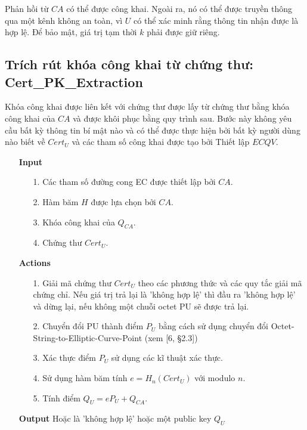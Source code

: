 \documentclass[a4paper,12pt]{report}
\begin{document}
Phản hồi từ $CA$ có thể được công khai. Ngoài ra, nó có thể được truyền thông qua một kênh không an toàn, vì $U$ có thể xác minh rằng thông tin nhận được là hợp lệ. Để bảo mật, giá trị tạm thời $k$ phải được giữ riêng.

\subsection{Trích rút khóa công khai từ chứng thư: Cert\_PK\_Extraction}
Khóa công khai được liên kết với chứng thư được lấy từ chứng thư bằng khóa công khai của $CA$ và được khôi phục bằng quy trình sau. Bước này không yêu cầu bất kỳ thông tin bí mật nào và có thể được thực hiện bởi bất kỳ người dùng nào biết về $Cert_U$ và các tham số công khai được tạo bởi Thiết lập $ECQV$.
\begin{itemize}
\item[] \textbf{Input}
\begin{itemize}
\item[1. ] Các tham số đường cong EC được thiết lập bởi $CA$.
\item[2. ] Hàm băm $H$ được lựa chọn bởi $CA$.
\item[3. ] Khóa công khai của $Q_{CA}$.
\item[4. ] Chứng thư $Cert_U$.
\end{itemize}
\item[] \textbf{Actions}
\begin{itemize}
\item[1. ] Giải mã chứng thư $Cert_U$ theo các phương thức và các quy tắc giải mã chứng chỉ. Nếu giá trị trả lại là 'không hợp lệ' thì đầu ra 'không hợp lệ' và dừng lại, nếu không một chuỗi octet PU sẽ được trả lại.
\item[2. ] Chuyển đổi PU thành điểm $P_U$ bằng cách sử dụng chuyển đổi Octet-String-to-Elliptic-Curve-Point (xem [6, §2.3])
\item[3. ] Xác thực điểm $P_U$ sử dụng các kĩ thuật xác thực.
\item[4. ] Sử dụng hàm băm tính $e = H_n(Cert_U)$ với modulo $n$.
\item[5. ] Tính điểm $Q_U = eP_U + Q_{CA}$.
\end{itemize}
\item[] \textbf{Output} Hoặc là 'không hợp lệ' hoặc một public key $Q_U$
\end{itemize}
\end{document}
